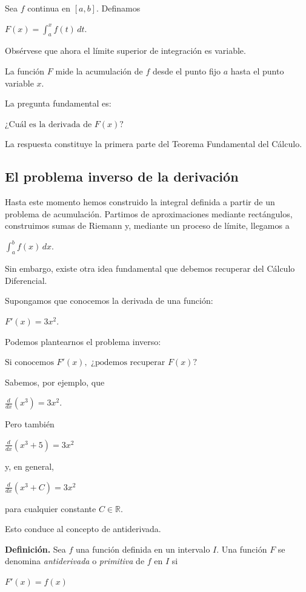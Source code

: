 \documentclass[12pt]{article}
\begin{document}
Sea $f$ continua en $[a,b]$. Definamos

$
F(x)
=
\int_a^x f(t)\,dt.
$

Obsérvese que ahora el límite superior de integración es variable.

La función $F$ mide la acumulación de $f$ desde el punto fijo $a$ hasta
el punto variable $x$.

La pregunta fundamental es:

$
\boxed{\text{¿Cuál es la derivada de }F(x)?}
$

La respuesta constituye la primera parte del Teorema Fundamental del
Cálculo.
\subsection*{El problema inverso de la derivación}

Hasta este momento hemos construido la integral definida a partir de un
problema de acumulación. Partimos de aproximaciones mediante rectángulos,
construimos sumas de Riemann y, mediante un proceso de límite, llegamos a

$
\int_a^b f(x)\,dx.
$

Sin embargo, existe otra idea fundamental que debemos recuperar del
Cálculo Diferencial.

Supongamos que conocemos la derivada de una función:

$
F'(x)=3x^2.
$

Podemos plantearnos el problema inverso:

$
\boxed{
\text{Si conocemos }F'(x),\text{ ¿podemos recuperar }F(x)?
}
$

Sabemos, por ejemplo, que

$
\frac{d}{dx}(x^3)=3x^2.
$

Pero también

$
\frac{d}{dx}(x^3+5)=3x^2
$

y, en general,

$
\frac{d}{dx}(x^3+C)=3x^2
$

para cualquier constante $C\in\mathbb{R}$.

Esto conduce al concepto de antiderivada.

\textbf{Definición.}
Sea $f$ una función definida en un intervalo $I$. Una función $F$ se
denomina \emph{antiderivada} o \emph{primitiva} de $f$ en $I$ si

$
F'(x)=f(x)
$
\end{document}

